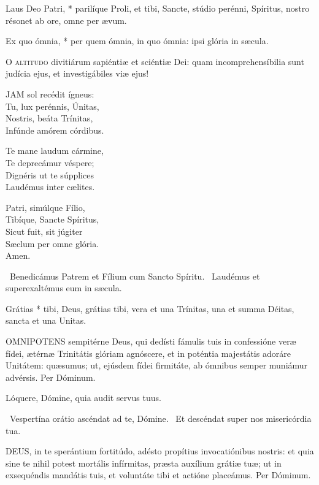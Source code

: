  Laus Deo Patri, * parilíque Proli, et tibi, Sancte, stúdio perénni, Spíritus, nostro résonet ab ore, omne per ævum.

 Ex quo ómnia, * per quem ómnia, in quo ómnia: ipsi glória in sæcula.


\lettrine[lines=2]{O}{} \textsc{altitudo} divitiárum sapiéntiæ et sciéntiæ Dei: quam incomprehensíbilia sunt judícia ejus, et investigábiles viæ ejus!


\lettrine[lines=2]{J}{AM} sol recédit ígneus:\\
Tu, lux perénnis, Únitas,\\
Nostris, beáta Trínitas,\\
Infúnde amórem córdibus.

Te mane laudum cármine,\\
Te deprecámur véspere;\\
Dignéris ut te súpplices\\
Laudémus inter cælites.

Patri, simúlque Fílio,\\
Tibíque, Sancte Spíritus,\\
Sicut fuit, sit júgiter\\
Sæclum per omne glória.\\
Amen.

\V\ Benedicámus Patrem et Fílium cum Sancto Spíritu. \R\ Laudémus et superexaltémus eum in sæcula.

 Grátias * tibi, Deus, grátias tibi, vera et una Trínitas, una et summa Déitas, sancta et una Unitas.


\lettrine[lines=2]{O}{MNIPOTENS} sempitérne Deus, qui dedísti fámulis tuis in confessióne veræ fídei, ætérnæ Trinitátis glóriam agnóscere, et in poténtia majestátis adoráre Unitátem: quæsumus; ut, ejúsdem fídei firmitáte, ab ómnibus semper muniámur advérsis. Per Dóminum.


 Lóquere, Dómine, quia audit servus tuus.

\V\ Vespertína orátio ascéndat ad te, Dómine. \R\ Et descéndat super nos misericórdia tua.


\lettrine[lines=2]{D}{EUS}, in te sperántium fortitúdo, adésto propítius invocatiónibus nostris: et quia sine te nihil potest mortális infírmitas, præsta auxílium grátiæ tuæ; ut in exsequéndis mandátis tuis, et voluntáte tibi et actióne placeámus. Per Dóminum.

